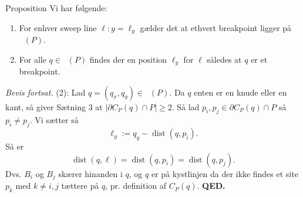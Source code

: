 \documentclass{beamer} %
\newcommand{\abs}[1]{\left\lvert #1 \right\rvert}
\DeclareMathOperator{\dist}{dist}
\DeclareMathOperator{\VorG}{Vor_{G}}
\begin{document}
\begin{frame}
\begin{block}{Proposition}
Vi har følgende:
\begin{enumerate}
	\item For enhver sweep line $\ell \colon y = \ell_y$ gælder det at ethvert breakpoint ligger på $\VorG(P)$.
	\item For alle $q \in \VorG(P)$ findes der en position $\ell_y$ for $\ell$ således at $q$ er et breakpoint.
\end{enumerate}
\end{block}
\textit{Bevis fortsat.} \pause (2): \pause Lad $q = (q_x, q_y) \in \VorG(P)$. \pause Da $q$ enten er en knude eller en kant\pause, så giver Sætning 3 at $\abs{\partial C_P(q) \cap P} \geq 2$. \pause Så lad $p_i, p_j \in \partial C_P(q) \cap P$ så $p_i \ne p_j$. \pause Vi sætter så
\[
	\ell_y := q_y - \dist(q, p_i).
\]
\pause Så er
\[
	\dist(q, \ell) = \dist(q, p_i) = \dist(q, p_j).
\]
\pause Dvs. $B_i$ og $B_j$ skærer hinanden i $q$\pause, og $q$ er på kystlinjen da der ikke findes et site $p_k$ med $k \ne i, j$ tættere på $q$\pause, pr. definition af $C_P(q)$. \pause \textbf{QED.}
\end{frame}
\end{document}
